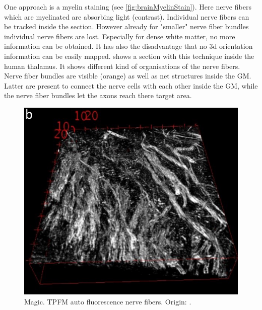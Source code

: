 One approach is a myelin staining (see \cref{fig:brainMyelinStain}).
Here nerve fibers which are myelinated are absorbing light (contrast).
Individual nerve fibers can be tracked inside the section.
However already for "smaller" nerve fiber bundles individual nerve fibers are lost.
Especially for dense white matter, no more information can be obtained.
It has also the disadvantage that no 3d orientation information can be easily mapped.
 shows a section with this technique inside the human thalamus.
It shows different kind of organisations of the nerve fibers.
Nerve fiber bundles are visible (orange) as well as net structures inside the \ac{GM}.
Latter are present to connect the nerve cells with each other inside the \ac{GM}, while the nerve fiber bundles let the axons reach there target area.
\par
% 
% 
\begin{figure}[!t]
	\centering
	\includegraphics{gfx/neuroanatomy/magic.png}
	\caption{Magic. TPFM auto fluorescence nerve fibers. Origin: \cite{Costantini2020}.}
	\label{fig:brainTPFM}
\end{figure}
% 
